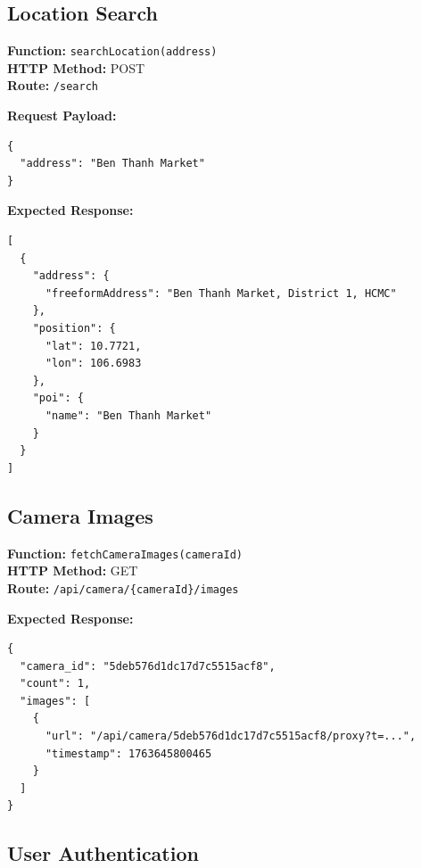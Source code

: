 \subsection{Location Search}

\textbf{Function:} \texttt{searchLocation(address)}\\
\textbf{HTTP Method:} POST\\
\textbf{Route:} \texttt{/search}

\textbf{Request Payload:}
\begin{tcolorbox}[colback=gray!10,colframe=black!50,arc=2mm]
\begin{verbatim}
{
  "address": "Ben Thanh Market"
}
\end{verbatim}
\end{tcolorbox}

\textbf{Expected Response:}
\begin{tcolorbox}[colback=gray!10,colframe=black!50,arc=2mm]
\begin{verbatim}
[
  {
    "address": {
      "freeformAddress": "Ben Thanh Market, District 1, HCMC"
    },
    "position": {
      "lat": 10.7721,
      "lon": 106.6983
    },
    "poi": {
      "name": "Ben Thanh Market"
    }
  }
]
\end{verbatim}
\end{tcolorbox}

\subsection{Camera Images}

\textbf{Function:} \texttt{fetchCameraImages(cameraId)}\\
\textbf{HTTP Method:} GET\\
\textbf{Route:} \texttt{/api/camera/\{cameraId\}/images}

\textbf{Expected Response:}
\begin{tcolorbox}[colback=gray!10,colframe=black!50,arc=2mm]
\begin{verbatim}
{
  "camera_id": "5deb576d1dc17d7c5515acf8",
  "count": 1,
  "images": [
    {
      "url": "/api/camera/5deb576d1dc17d7c5515acf8/proxy?t=...",
      "timestamp": 1763645800465
    }
  ]
}
\end{verbatim}
\end{tcolorbox}

\subsection{User Authentication}

